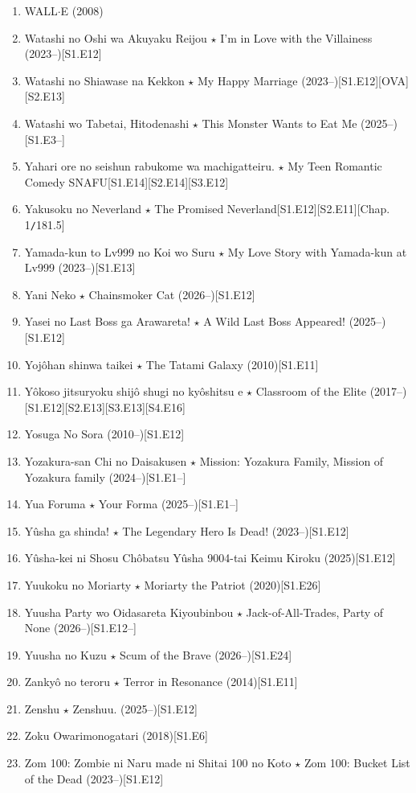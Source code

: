 \documentclass{article}
\begin{document}
\begin{enumerate}
    \item {\sc WALL$\cdot$E} (2008)
    \item {\sc Watashi no Oshi wa Akuyaku Reijou $\star$ I'm in Love with the Villainess} (2023--)\hfill[S1.E12]
    \item {\sc Watashi no Shiawase na Kekkon $\star$ My Happy Marriage} (2023--)\hfill[S1.E12][OVA][S2.E13]
    \item Watashi wo Tabetai, Hitodenashi $\star$ This Monster Wants to Eat Me (2025--)\hfill[S1.E3--]
    \item {\sc Yahari ore no seishun rabukome wa machigatteiru. $\star$ My Teen Romantic Comedy SNAFU}\hfill[S1.E14][S2.E14][S3.E12]
    \item {\sc Yakusoku no Neverland $\star$ The Promised Neverland}\hfill[S1.E12][S2.E11][Chap. 1{\tt/}181.5]
    \item Yamada-kun to Lv999 no Koi wo Suru $\star$ My Love Story with Yamada-kun at Lv999 (2023--)\hfill[S1.E13]
    \item {\sc Yani Neko $\star$ Chainsmoker Cat} (2026--)\hfill[S1.E12]
    \item {\sc Yasei no Last Boss ga Arawareta! $\star$ A Wild Last Boss Appeared!} (2025--)\hfill[S1.E12]
    \item {\sc Yojôhan shinwa taikei $\star$ The Tatami Galaxy} (2010)\hfill[S1.E11]
    \item {\sc Yôkoso jitsuryoku shijô shugi no kyôshitsu e $\star$ Classroom of the Elite} (2017--)\hfill[S1.E12][S2.E13][S3.E13][S4.E16]
    \item {\sc Yosuga No Sora} (2010--)\hfill[S1.E12]
    \item Yozakura-san Chi no Daisakusen $\star$ Mission: Yozakura Family, Mission of Yozakura family (2024--)\hfill[S1.E1--]
    \item Yua Foruma $\star$ Your Forma (2025--)\hfill[S1.E1--]
    \item {\sc Yûsha ga shinda! $\star$ The Legendary Hero Is Dead!} (2023--)\hfill[S1.E12]
    \item {\sc Yûsha-kei ni Shosu Chôbatsu Yûsha 9004-tai Keimu Kiroku} (2025)\hfill[S1.E12]
    \item {\sc Yuukoku no Moriarty $\star$ Moriarty the Patriot} (2020)\hfill[S1.E26]
    \item {\sc Yuusha Party wo Oidasareta Kiyoubinbou $\star$ Jack-of-All-Trades, Party of None} (2026--)\hfill[S1.E12--]
    \item {\sc Yuusha no Kuzu $\star$ Scum of the Brave} (2026--)\hfill[S1.E24]
    \item {\sc Zankyô no teroru $\star$ Terror in Resonance} (2014)\hfill[S1.E11]
    \item {\sc Zenshu $\star$ Zenshuu.} (2025--)\hfill[S1.E12]
    \item {\sc Zoku Owarimonogatari} (2018)[S1.E6]
    \item {\sc Zom 100: Zombie ni Naru made ni Shitai 100 no Koto $\star$ Zom 100: Bucket List of the Dead} (2023--)\hfill[S1.E12]
\end{enumerate}
\end{document}
